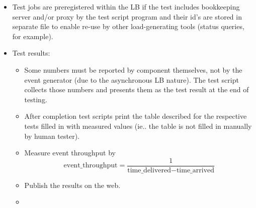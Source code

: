\begin{itemize}
\item Test jobs are preregistered within the LB if the test includes
bookkeeping server and/or proxy by the test script program and their id's are
stored in separate file to enable re-use by other load-generating tools (status
queries, for example).

\item Test results:
   \begin{itemize}
   \item Some numbers must be reported by component themselves, not by
      the event generator (due to the asynchronous LB nature). The
      test script collects those numbers and presents them as the test
      result at the end of testing.

    \item After completion test scripts print the table described for the
      respective tests filled in with measured values (ie.. the table
      is not filled in manually by human tester).

    \item Measure event throughput by
    \[ \mbox{event\_throughput} = \frac{1}{\mbox{time\_delivered} - \mbox{time\_arrived}} \]

    \item Publish the results on the web.
    
    \item {}
    \end{itemize}

%
\end{itemize}



\endinput


In the following subsections we describe performance and stress tests for
individual LB components.  They include both tests of the isolated components
on one node (may require binaries from other components to produce/consume
events) as well as tests of LB components among more nodes.


\subsection{Logging library test}

